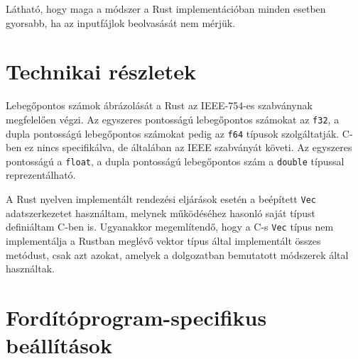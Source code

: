 Látható, hogy maga a módszer a Rust implementációban minden esetben gyorsabb, ha az inputfájlok beolvasását nem mérjük.

\section{Technikai részletek}
Lebegőpontos számok ábrázolását a Rust az IEEE-754-es szabványnak megfelelően végzi. Az egyszeres pontosságú lebegőpontos számokat az \lstinline{f32}, a dupla pontosságú lebegőpontos számokat pedig az \lstinline{f64} típusok szolgáltatják. C-ben ez nincs specifikálva, de általában az IEEE szabványát követi. Az egyszeres pontosságú a \lstinline{float}, a dupla pontosságú lebegőpontos szám a \lstinline{double} típussal reprezentálható.

A Rust nyelven implementált rendezési eljárások esetén a beépített \lstinline{Vec} adatszerkezetet használtam, melynek működéséhez hasonló saját típust definiáltam C-ben is. Ugyanakkor megemlítendő, hogy a C-s \lstinline{Vec} típus nem implementálja a Rustban meglévő vektor típus által implementált összes metódust, csak azt azokat, amelyek a dolgozatban bemutatott módszerek által használtak.

\section{Fordítóprogram-specifikus beállítások}
